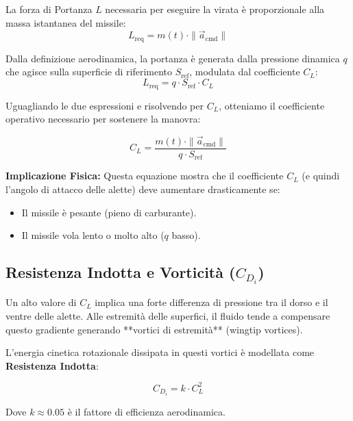 \documentclass[12pt,a4paper]{article}
\begin{document}
La forza di Portanza $L$ necessaria per eseguire la virata è proporzionale alla massa istantanea del missile:
\begin{equation}
    L_{\text{req}} = m(t) \cdot \|\vec{a}_{\text{cmd}}\|
\end{equation}

Dalla definizione aerodinamica, la portanza è generata dalla pressione dinamica $q$ che agisce sulla superficie di riferimento $S_{\text{ref}}$, modulata dal coefficiente $C_L$:
\begin{equation}
    L_{\text{req}} = q \cdot S_{\text{ref}} \cdot C_L
\end{equation}

Uguagliando le due espressioni e risolvendo per $C_L$, otteniamo il coefficiente operativo necessario per sostenere la manovra:

\begin{equation}
    C_L = \frac{m(t) \cdot \|\vec{a}_{\text{cmd}}\|}{q \cdot S_{\text{ref}}}
\end{equation}

\textbf{Implicazione Fisica:} Questa equazione mostra che il coefficiente $C_L$ (e quindi l'angolo di attacco delle alette) deve aumentare drasticamente se:
\begin{itemize}
    \item Il missile è pesante (pieno di carburante).
    \item Il missile vola lento o molto alto ($q$ basso).
\end{itemize}

\subsection{Resistenza Indotta e Vorticità ($C_{D_i}$)}
Un alto valore di $C_L$ implica una forte differenza di pressione tra il dorso e il ventre delle alette. Alle estremità delle superfici, il fluido tende a compensare questo gradiente generando **vortici di estremità** (wingtip vortices).

L'energia cinetica rotazionale dissipata in questi vortici è modellata come \textbf{Resistenza Indotta}:

\begin{equation}
    C_{D_i} = k \cdot C_L^2
\end{equation}

Dove $k \approx 0.05$ è il fattore di efficienza aerodinamica.
\end{document}
